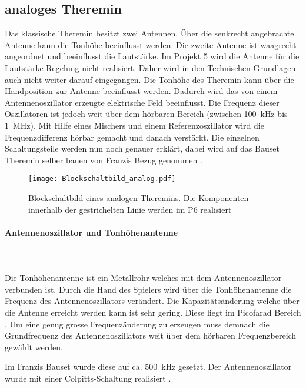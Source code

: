 \subsection{analoges Theremin}\label{subsec:Theremin_analog}
Das klassische Theremin besitzt zwei Antennen. Über die senkrecht angebrachte Antenne kann die  Tonhöhe beeinflusst werden. Die zweite Antenne ist waagrecht angeordnet und beeinflusst die Lautstärke. Im Projekt 5 wird die Antenne für die Lautstärke Regelung nicht realisiert. Daher wird in den Technischen Grundlagen auch nicht weiter darauf eingegangen. 
Die Tonhöhe des Theremin kann über die Handposition zur Antenne beeinflusst werden. Dadurch wird das von einem Antennenoszillator erzeugte elektrische Feld beeinflusst. Die Frequenz dieser Oszillatoren ist jedoch weit über dem hörbaren Bereich (zwischen \SI{100}{kHz} bis \SI{1}{MHz}). Mit Hilfe eines Mischers und einem Referenzoszillator wird die Frequenzdifferenz hörbar gemacht und danach verstärkt. Die einzelnen Schaltungsteile werden nun noch genauer erklärt, dabei wird auf das Bauset \glqq Theremin selber bauen\grqq{} von Franzis Bezug genommen \cite{Franzis}.

\begin{figure}[h]
	\centering
	\texttt{[image: Blockschaltbild\_analog.pdf]}
	\caption{Blockschaltbild eines analogen Theremins. Die Komponenten innerhalb der gestrichelten Linie werden im P6 realisiert}
	\label{img:Blockschaltbild_analog}
\end{figure}

\paragraph{Antennenoszillator und Tonhöhenantenne}\mbox{}\\ 
\\Die Tonhöhenantenne ist ein Metallrohr welches mit dem Antennenoszillator verbunden ist.
Durch die Hand des Spielers wird über die Tonhöhenantenne die Frequenz des Antennenoszillators verändert. Die Kapazitätsänderung welche über die Antenne erreicht werden kann ist sehr gering. Diese liegt im Picofarad Bereich \cite{physik_theremin}. Um eine genug grosse Frequenzänderung zu erzeugen muss demnach die Grundfrequenz des Antennenoszillators weit über dem hörbaren Frequenzbereich gewählt werden. 

Im Franzis Bauset wurde diese auf ca. \SI{500}{kHz} gesetzt. Der Antennenoszillator wurde mit einer Colpitts-Schaltung realisiert \cite{Franzis}.
 

